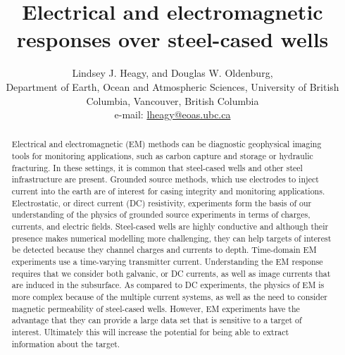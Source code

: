 \documentclass[
    paper
]{geophysics}
\begin{document}
\title{Electrical and electromagnetic responses over steel-cased wells}

\renewcommand{\thefootnote}{\fnsymbol{footnote}}

\ms{}  %



\author{%
Lindsey J. Heagy\footnotemark[1],
and %
Douglas W. Oldenburg\footnotemark[1], \\
\footnotemark[1]Department of Earth, Ocean and Atmospheric Sciences, University of British Columbia, Vancouver, British Columbia \\
e-mail: \href{mailto:lheagy@eoas.ubc.ca}{lheagy@eoas.ubc.ca}
}


\maketitle

\begin{abstract}
  Electrical and electromagnetic (EM) methods can be diagnostic geophysical imaging tools for monitoring applications, such as carbon capture and storage or hydraulic fracturing. In these settings, it is common that steel-cased wells and other steel infrastructure are present. Grounded source methods, which use electrodes to inject current into the earth are of interest for casing integrity and monitoring applications. Electrostatic, or direct current (DC) resistivity, experiments form the basis of our understanding of the physics of grounded source experiments in terms of charges, currents, and electric fields. Steel-cased wells are highly conductive and although their presence makes numerical modelling more challenging, they can help targets of interest be detected because they channel charges and currents to depth. Time-domain EM experiments use a time-varying transmitter current. Understanding the EM response requires that we consider both galvanic, or DC currents, as well as image currents that are induced in the subsurface. As compared to DC experiments, the physics of EM is more complex because of the multiple current systems, as well as the need to consider magnetic permeability of steel-cased wells. However, EM experiments have the advantage that they can provide a large data set that is sensitive to a target of interest. Ultimately this will increase the potential for being able to extract information about the target.
\end{abstract}
\end{document}
